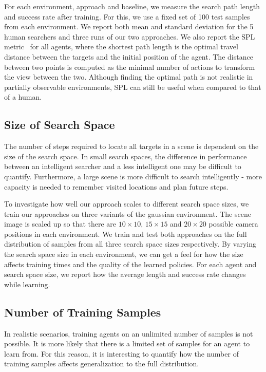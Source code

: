 For each environment, approach and baseline, we measure the search path length and success rate after training.
For this, we use a fixed set of 100 test samples from each environment.
We report both mean and standard deviation for the 5 human searchers and three runs of our two approaches.
We also report the SPL metric~\cite{anderson_evaluation_2018} for all agents, where the shortest path length is the optimal travel distance between the targets and the initial position of the agent.
The distance between two points is computed as the minimal number of actions to transform the view between the two.
Although finding the optimal path is not realistic in partially observable environments, SPL can still be useful when compared to that of a human.

\subsection{Size of Search Space}

The number of steps required to locate all targets in a scene is dependent on the size of the search space.
In small search spaces, the difference in performance between an intelligent searcher and a less intelligent one may be difficult to quantify.
Furthermore, a large scene is more difficult to search intelligently - more capacity is needed to remember visited locations and plan future steps.

To investigate how well our approach scales to different search space sizes, we train our approaches on three variants of the gaussian environment.
The scene image is scaled up so that there are \(10 \times 10\), \(15 \times 15\) and \(20 \times 20\) possible camera positions in each environment.
We train and test both approaches on the full distribution of samples from all three search space sizes respectively.
By varying the search space size in each environment, we can get a feel for how the size affects training times and the quality of the learned policies.
For each agent and search space size, we report how the average length and success rate changes while learning.

\subsection{Number of Training Samples}

In realistic scenarios, training agents on an unlimited number of samples is not possible.
It is more likely that there is a limited set of samples for an agent to learn from.
For this reason, it is interesting to quantify how the number of training samples affects generalization to the full distribution.

